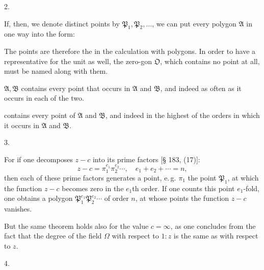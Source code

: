 2. 

If, then, we denote distinct points by $\mathfrak{P}_1, \mathfrak{P}_2, \ldots$, we can put every polygon $\mathfrak{A}$ in one way into the form:


The points are therefore the  in the calculation with polygons. In order to have a representative for the unit as well, the \glqq zero-gon\grqq{} $\mathfrak{O}$, which contains no point at all, must be named along with them.

 $\mathfrak{A}, \mathfrak{B}$ contains every point that occurs in $\mathfrak{A}$ and $\mathfrak{B}$, and indeed as often as it occurs in each of the two.

 contains every point of $\mathfrak{A}$ and $\mathfrak{B}$, and indeed in the highest of the orders in which it occurs in $\mathfrak{A}$ and $\mathfrak{B}$.

3. 

For if one decomposes $z - c$ into its prime factors [§ 183, (17)]:
\[
z - c = \pi_1^{e_1}\pi_2^{e_2}\cdots, \quad e_1 + e_2 + \cdots = n,
\]
then each of these prime factors generates a point, e.\,g. $\pi_1$ the point $\mathfrak{P}_1$, at which the function $z - c$ becomes zero in the $e_1$th order. If one counts this point $e_1$-fold, one obtains a polygon $\mathfrak{P}_1^{e_1}\mathfrak{P}_2^{e_2}\cdots$ of order $n$, at whose points the function $z - c$ vanishes.

But the same theorem holds also for the value $c = \infty$, as one concludes from the fact that the degree of the field $\Omega$ with respect to $1 : z$ is the same as with respect to $z$.

4. 
